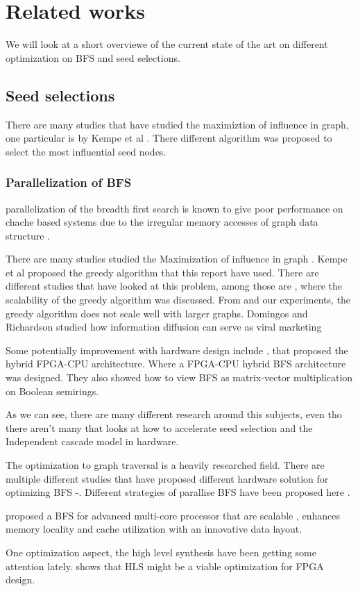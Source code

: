 \chapter{Related works} \label{relatedWork}
We will look at a short overviewe of the current state of the art on different optimization on BFS and seed selections.

\section{Seed selections}
There are many studies that have studied the maximiztion of influence in graph, one particular is by Kempe et al \cite{MaximizeSpread2003}. There different algorithm was proposed to select the most influential seed nodes. 

\subsection{Parallelization of BFS}
parallelization of the breadth first search is known to give poor performance on chache based systems due to the irregular memory accesses of graph data structure \cite{xia2009topologically}.





There are many studies studied the Maximization of influence in graph \cite{MaximizeSpread2003}.  Kempe et al proposed the greedy algorithm that this report have used. There are different studies that have looked at this problem, among those are \cite{InfluenceMax}, where the scalability of the greedy algorithm was discussed. From \cite{InfluenceMax} and our experiments, the greedy algorithm does not scale well with larger graphs. Domingos and Richardson studied how information diffusion can serve as viral marketing \cite{ViralMarketing}

Some potentially improvement with hardware design include \cite{HybridBFS2015}, that proposed the hybrid FPGA-CPU architecture. Where a FPGA-CPU hybrid BFS architecture was designed. They also showed how to view BFS as matrix-vector multiplication on Boolean semirings. 

As we can see, there are many different research around this subjects, even tho there aren't many that looks at how to accelerate seed selection and the Independent cascade model in hardware.

The optimization to graph traversal is a heavily researched field. There are multiple different studies that have proposed different hardware solution for optimizing BFS \cite{ScalableGraphEx}-\cite{DirectOptimizeBFS}. Different strategies of parallise BFS have been proposed here \cite{ParallelBFS2011}. 

\cite{ScalableGraphEx} proposed a BFS for advanced multi-core processor that are scalable , enhances memory locality and cache utilization with an innovative data layout.

One optimization aspect, the high level synthesis have been getting some attention lately. \cite{HLSready2015} shows that HLS might be a viable optimization for FPGA design. 

